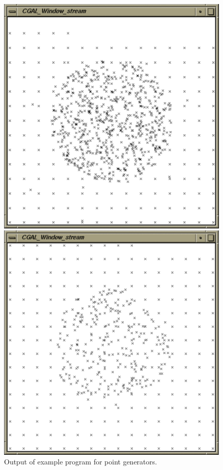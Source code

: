 \begin{ccTexOnly}
  \begin{figure}
    \noindent
    \hspace*{0.025\textwidth}%
    \begin{minipage}{0.45\textwidth}%
      \includegraphics[width=\textwidth]{Generator/generators_prog1}
      \caption{Output of example program for point generators.}
      \label{figurePointGenerator}
    \end{minipage}%
    \hspace*{0.05\textwidth}%
    \begin{minipage}{0.45\textwidth}%
      \includegraphics[width=\textwidth]{Generator/generators_prog2}

\end{minipage}
\end{figure}
\end{ccTexOnly}
